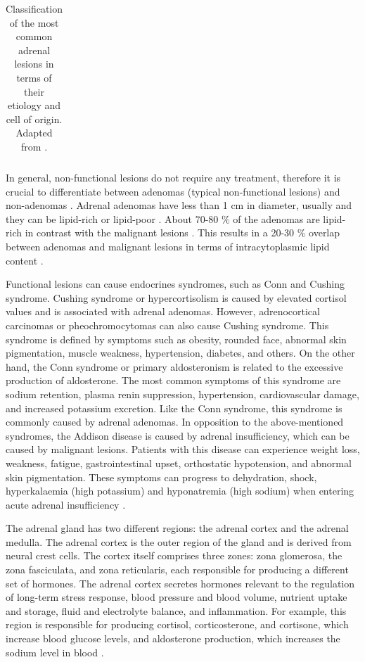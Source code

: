 \documentclass{article}
\begin{document}
\begin{table}[]
\begin{tabular}{cccc}
        \\\bottomrule
    \end{tabular}
    \caption{Classification of the most common adrenal lesions in terms of their
        etiology and cell of origin.  Adapted from \cite{Panda2015}.}
    \label{tab:lesions}
\end{table}

In general, non-functional lesions do not require any treatment, therefore it is
crucial to differentiate between adenomas (typical non-functional lesions) and
non-adenomas \cite{Platzek2019}. Adrenal adenomas have less than 1 cm in
diameter, usually and they can be lipid-rich or lipid-poor \cite{Panda2015}.
About 70-80 \% of the adenomas are lipid-rich in contrast with the malignant
lesions \cite{Platzek2019}. This results in a 20-30 \% overlap between adenomas
and malignant lesions in terms of intracytoplasmic lipid content
\cite{Israel2004}.

Functional lesions can cause endocrines syndromes, such as
Conn and Cushing syndrome. Cushing syndrome or hypercortisolism is caused by
elevated cortisol values and is associated with adrenal adenomas. However,
adrenocortical carcinomas or pheochromocytomas can also cause Cushing syndrome.
This syndrome is defined by symptoms such as obesity, rounded face, abnormal
skin pigmentation, muscle weakness, hypertension, diabetes, and others. On the
other hand, the Conn syndrome or primary aldosteronism is related to the
excessive production of aldosterone. The most common symptoms of this syndrome
are sodium retention, plasma renin suppression, hypertension, cardiovascular
damage, and increased potassium excretion. Like the Conn syndrome, this syndrome
is commonly caused by adrenal adenomas.  In opposition to the above-mentioned
syndromes, the Addison disease is caused by adrenal insufficiency, which can be
caused by malignant lesions. Patients with this disease can experience weight
loss, weakness, fatigue, gastrointestinal upset, orthostatic hypotension, and
abnormal skin pigmentation. These symptoms can progress to dehydration, shock,
hyperkalaemia (high potassium) and hyponatremia (high sodium) when entering
acute adrenal insufficiency \cite{Wang2018}.

The adrenal gland has two different regions: the adrenal cortex and the adrenal
medulla. The adrenal cortex is the outer region of the gland and is derived from
neural crest cells. The cortex itself comprises three zones: zona glomerosa, the
zona fasciculata, and zona reticularis, each responsible for producing a
different set of hormones. The adrenal cortex secretes hormones relevant to the
regulation of long-term stress response, blood pressure and blood volume,
nutrient uptake and storage, fluid and electrolyte balance, and inflammation.
For example, this region is responsible for producing cortisol, corticosterone,
and cortisone, which increase blood glucose levels, and aldosterone production,
which increases the sodium level in blood \cite{open}.
\end{document}
